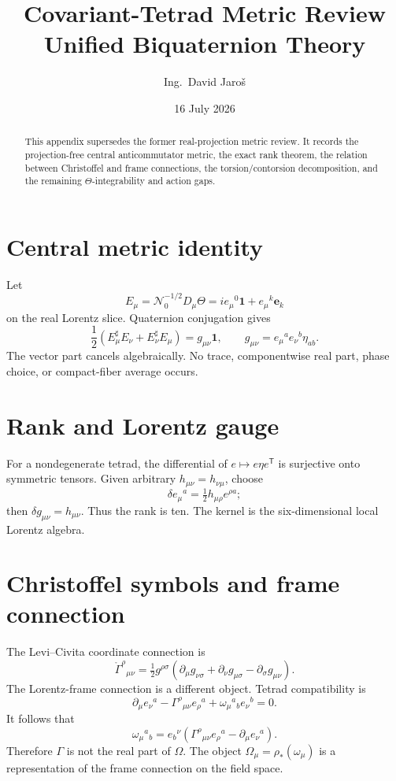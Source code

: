 \documentclass[11pt,a4paper]{article}
\title{Covariant-Tetrad Metric Review\\\large Unified Biquaternion Theory}
\author{Ing.\ David Jaroš}
\date{16 July 2026}
\begin{document}
\maketitle

\begin{abstract}
This appendix supersedes the former real-projection metric review.  It records
the projection-free central anticommutator metric, the exact rank theorem, the
relation between Christoffel and frame connections, the torsion/contorsion
decomposition, and the remaining $\Theta$-integrability and action gaps.
\end{abstract}

\section{Central metric identity}
Let
\[
 E_\mu=\mathcal N_0^{-1/2}D_\mu\Theta
 =i e_\mu{}^0\mathbf1+e_\mu{}^k\mathbf e_k
\]
on the real Lorentz slice.  Quaternion conjugation gives
\[
 \boxed{\frac12(E_\mu^\sharp E_\nu+E_\nu^\sharp E_\mu)
 =g_{\mu\nu}\mathbf1},
\qquad
 g_{\mu\nu}=e_\mu{}^ae_\nu{}^b\eta_{ab}.
\]
The vector part cancels algebraically.  No trace, componentwise real part,
phase choice, or compact-fiber average occurs.

\section{Rank and Lorentz gauge}
For a nondegenerate tetrad, the differential of
$e\mapsto e\eta e^{\mathsf T}$ is surjective onto symmetric tensors.  Given
arbitrary $h_{\mu\nu}=h_{\nu\mu}$, choose
\[
 \delta e_\mu{}^a=\tfrac12 h_{\mu\rho}e^{\rho a};
\]
then $\delta g_{\mu\nu}=h_{\mu\nu}$.  Thus the rank is ten.  The kernel is the
six-dimensional local Lorentz algebra.

\section{Christoffel symbols and frame connection}
The Levi--Civita coordinate connection is
\[
 \mathring\Gamma^\rho{}_{\mu\nu}
 =\tfrac12g^{\rho\sigma}
 (\partial_\mu g_{\nu\sigma}+\partial_\nu g_{\mu\sigma}
 -\partial_\sigma g_{\mu\nu}).
\]
The Lorentz-frame connection is a different object.  Tetrad compatibility is
\[
 \partial_\mu e_\nu{}^a
 -\Gamma^\rho{}_{\mu\nu}e_\rho{}^a
 +\omega_\mu{}^a{}_b e_\nu{}^b=0.
\]
It follows that
\[
 \omega_\mu{}^a{}_b
 =e_b{}^\nu
  (\Gamma^\rho{}_{\mu\nu}e_\rho{}^a-\partial_\mu e_\nu{}^a).
\]
Therefore $\Gamma$ is not the real part of $\Omega$.  The object
$\Omega_\mu=\rho_*(\omega_\mu)$ is a representation of the frame connection
on the field space.
\end{document}
